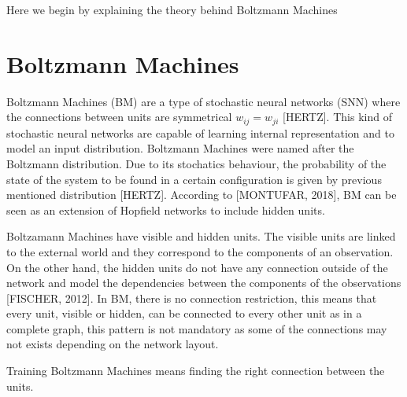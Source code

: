Here we begin by explaining the theory behind Boltzmann Machines

\section{Boltzmann Machines}

Boltzmann Machines (BM) are a type of stochastic neural networks (SNN) where the connections between units are symmetrical $w_{ij} = w_{ji}$ [HERTZ]. This kind of stochastic neural networks are capable of learning internal representation and to model an input distribution. Boltzmann Machines were named after the Boltzmann distribution. Due to its stochatics behaviour, the probability of the state of the system to be found in a certain configuration is given by previous mentioned distribution [HERTZ]. According to [MONTUFAR, 2018], BM can be seen as an extension of Hopfield networks to include hidden units.


Boltzamann Machines have visible and hidden units. The visible units are linked to the external world and they correspond to the components of an observation. On the other hand, the hidden units do not have any connection outside of the network and model the dependencies between the components of the observations [FISCHER, 2012]. In BM, there is no connection restriction, this means that every unit, visible or hidden, can be connected to every other unit as in a complete graph, this pattern is not mandatory as some of the connections may not exists depending on the network layout.

Training Boltzmann Machines means finding the right connection between the units.


